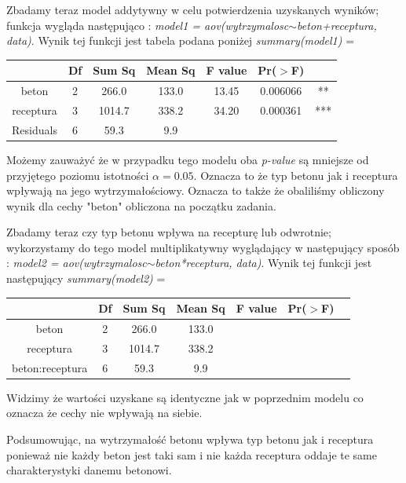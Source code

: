 \documentclass{article}
\begin{document}
Zbadamy teraz model addytywny w celu potwierdzenia uzyskanych wyników; funkcja wygląda następująco : \textit{model1 = aov(wytrzymalosc$\sim$beton+receptura, data)}. Wynik tej funkcji jest tabela podana poniżej \textit{summary(model1)} =
\begin{center} \begin{tabular}{|c|c|c|c|c|c|c|} \hline
& Df & Sum Sq & Mean Sq & F value & Pr($>$F) & \\ \hline
beton & 2 & 266.0 & 133.0 & 13.45 & 0.006066 & ** \\ \hline
receptura & 3 & 1014.7 & 338.2 & 34.20 & 0.000361 & *** \\ \hline
Residuals & 6 & 59.3 & 9.9 & & & \\ \hline
\end{tabular} \end{center}
Możemy zauważyć  że w przypadku tego modelu oba \textit{p-value} są mniejsze od przyjętego poziomu istotności $\alpha = 0.05$. Oznacza to że typ betonu jak i receptura wpływają na jego wytrzymałościowy. Oznacza to także że obaliliśmy obliczony wynik dla cechy "beton" obliczona na początku zadania. \\ \par

Zbadamy teraz czy typ betonu wpływa na recepturę lub odwrotnie; wykorzystamy do tego model multiplikatywny wyglądający w następujący sposób : \textit{model2 = aov(wytrzymalosc$\sim$beton*receptura, data)}. Wynik tej funkcji jest następujący \textit{summary(model2)} =
\begin{center} \begin{tabular}{|c|c|c|c|c|c|c|} \hline
& Df & Sum Sq & Mean Sq & F value & Pr($>$F) & \\ \hline
beton & 2 & 266.0 & 133.0 & & & \\ \hline
receptura & 3 & 1014.7 & 338.2 & & & \\ \hline
beton:receptura & 6 & 59.3 & 9.9 & & & \\ \hline
\end{tabular} \end{center}
Widzimy że wartości uzyskane są identyczne jak w poprzednim modelu co oznacza że cechy nie wpływają na siebie. \\ \par

Podsumowując, na wytrzymałość betonu wpływa typ betonu jak i receptura ponieważ nie każdy beton jest taki sam i nie każda receptura oddaje te same charakterystyki danemu betonowi.
\end{document}
